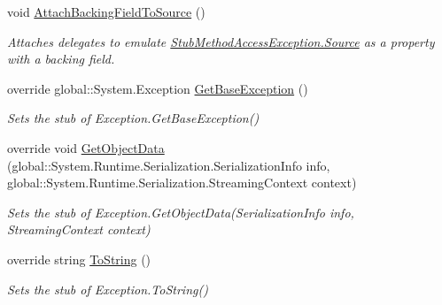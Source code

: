 \begin{DoxyCompactItemize}
void \hyperlink{class_system_1_1_fakes_1_1_stub_method_access_exception_a8988007a11ba86bf51347d59d18b006c}{Attach\-Backing\-Field\-To\-Source} ()
\begin{DoxyCompactList}\small\item\em Attaches delegates to emulate \hyperlink{class_system_1_1_fakes_1_1_stub_method_access_exception_a6946332820c256c8f50c166f5de31179}{Stub\-Method\-Access\-Exception.\-Source} as a property with a backing field.\end{DoxyCompactList}\item 
override global\-::\-System.\-Exception \hyperlink{class_system_1_1_fakes_1_1_stub_method_access_exception_a8898cff9966234f1e8ed15a67e19e825}{Get\-Base\-Exception} ()
\begin{DoxyCompactList}\small\item\em Sets the stub of Exception.\-Get\-Base\-Exception()\end{DoxyCompactList}\item 
override void \hyperlink{class_system_1_1_fakes_1_1_stub_method_access_exception_a5124fd47e369d856660d05e6edff1a6d}{Get\-Object\-Data} (global\-::\-System.\-Runtime.\-Serialization.\-Serialization\-Info info, global\-::\-System.\-Runtime.\-Serialization.\-Streaming\-Context context)
\begin{DoxyCompactList}\small\item\em Sets the stub of Exception.\-Get\-Object\-Data(\-Serialization\-Info info, Streaming\-Context context)\end{DoxyCompactList}\item 
override string \hyperlink{class_system_1_1_fakes_1_1_stub_method_access_exception_a66feb1a57504087f9d2e94a1c40a21b8}{To\-String} ()
\begin{DoxyCompactList}\small\item\em Sets the stub of Exception.\-To\-String()\end{DoxyCompactList}\end{DoxyCompactItemize}
